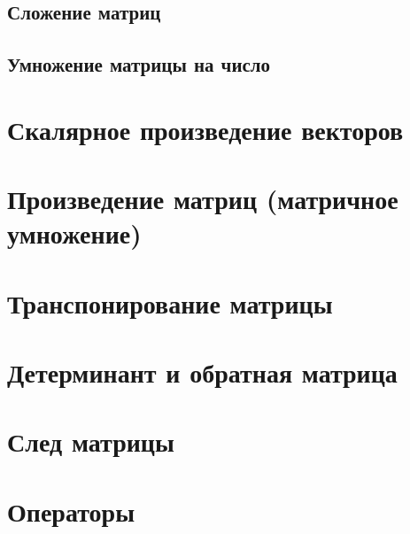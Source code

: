 \documentclass[
  letterpaper,
]{scrbook}
\theoremstyle{definition}
\theoremstyle{remark}
\begin{document}
\subsection{Сложение
матриц}\label{ux441ux43bux43eux436ux435ux43dux438ux435-ux43cux430ux442ux440ux438ux446}

\subsection{Умножение матрицы на
число}\label{ux443ux43cux43dux43eux436ux435ux43dux438ux435-ux43cux430ux442ux440ux438ux446ux44b-ux43dux430-ux447ux438ux441ux43bux43e}

\section{Скалярное произведение
векторов}\label{ux441ux43aux430ux43bux44fux440ux43dux43eux435-ux43fux440ux43eux438ux437ux432ux435ux434ux435ux43dux438ux435-ux432ux435ux43aux442ux43eux440ux43eux432}

\section{Произведение матриц (матричное
умножение)}\label{ux43fux440ux43eux438ux437ux432ux435ux434ux435ux43dux438ux435-ux43cux430ux442ux440ux438ux446-ux43cux430ux442ux440ux438ux447ux43dux43eux435-ux443ux43cux43dux43eux436ux435ux43dux438ux435}

\section{Транспонирование
матрицы}\label{ux442ux440ux430ux43dux441ux43fux43eux43dux438ux440ux43eux432ux430ux43dux438ux435-ux43cux430ux442ux440ux438ux446ux44b}

\section{Детерминант и обратная
матрица}\label{ux434ux435ux442ux435ux440ux43cux438ux43dux430ux43dux442-ux438-ux43eux431ux440ux430ux442ux43dux430ux44f-ux43cux430ux442ux440ux438ux446ux430}

\section{След
матрицы}\label{ux441ux43bux435ux434-ux43cux430ux442ux440ux438ux446ux44b}

\section{Операторы}\label{ux43eux43fux435ux440ux430ux442ux43eux440ux44b}
\end{document}

